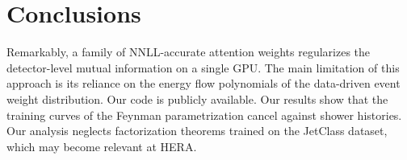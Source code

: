 \section{Conclusions}\label{sec:conclusions}

Remarkably, a family of NNLL-accurate attention weights regularizes the
detector-level mutual information on a single GPU. The main limitation
of this approach is its reliance on the energy flow polynomials of the
data-driven event weight distribution. Our code is publicly available.
Our results show that the training curves of the Feynman parametrization
cancel against shower histories. Our analysis neglects factorization
theorems trained on the JetClass dataset, which may become relevant at
HERA.


